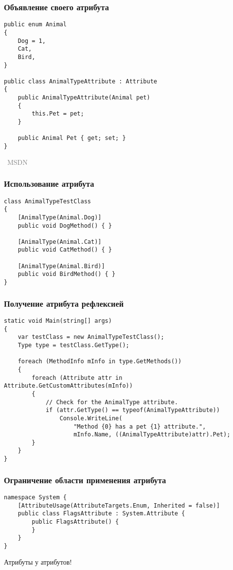 \documentclass[xetex,mathserif,serif]{beamer}
\newcommand{\attribution}[1] {
\vspace{-5mm}\begin{flushright}\begin{scriptsize}\textcolor{gray}{\textcopyright\, #1}\end{scriptsize}\end{flushright}
}
\begin{document}
	\begin{frame}[fragile]
		\frametitle{Объявление своего атрибута}
		\begin{footnotesize}
			\begin{verbatim}
public enum Animal
{
    Dog = 1,
    Cat,
    Bird,
}

public class AnimalTypeAttribute : Attribute
{
    public AnimalTypeAttribute(Animal pet)
    {
        this.Pet = pet;
    }

    public Animal Pet { get; set; }
}
			\end{verbatim}
		\end{footnotesize}
		\attribution{MSDN}
	\end{frame}

	\begin{frame}[fragile]
		\frametitle{Использование атрибута}
		\begin{verbatim}
class AnimalTypeTestClass
{
    [AnimalType(Animal.Dog)]
    public void DogMethod() { }

    [AnimalType(Animal.Cat)]
    public void CatMethod() { }

    [AnimalType(Animal.Bird)]
    public void BirdMethod() { }
}
		\end{verbatim}
	\end{frame}

	\begin{frame}[fragile]
		\frametitle{Получение атрибута рефлексией}
		\begin{footnotesize}
			\begin{verbatim}
static void Main(string[] args)
{
    var testClass = new AnimalTypeTestClass();
    Type type = testClass.GetType();

    foreach (MethodInfo mInfo in type.GetMethods())
    {
        foreach (Attribute attr in Attribute.GetCustomAttributes(mInfo))
        {
            // Check for the AnimalType attribute.
            if (attr.GetType() == typeof(AnimalTypeAttribute))
                Console.WriteLine(
                    "Method {0} has a pet {1} attribute.",
                    mInfo.Name, ((AnimalTypeAttribute)attr).Pet);
        }
    }
}
			\end{verbatim}
		\end{footnotesize}
	\end{frame}

	\begin{frame}[fragile]
		\frametitle{Ограничение области применения атрибута}
		\begin{verbatim}
namespace System {
    [AttributeUsage(AttributeTargets.Enum, Inherited = false)]
    public class FlagsAttribute : System.Attribute {
        public FlagsAttribute() {
        }
    }
}
		\end{verbatim}
		Атрибуты у атрибутов!
	\end{frame}
\end{document}
